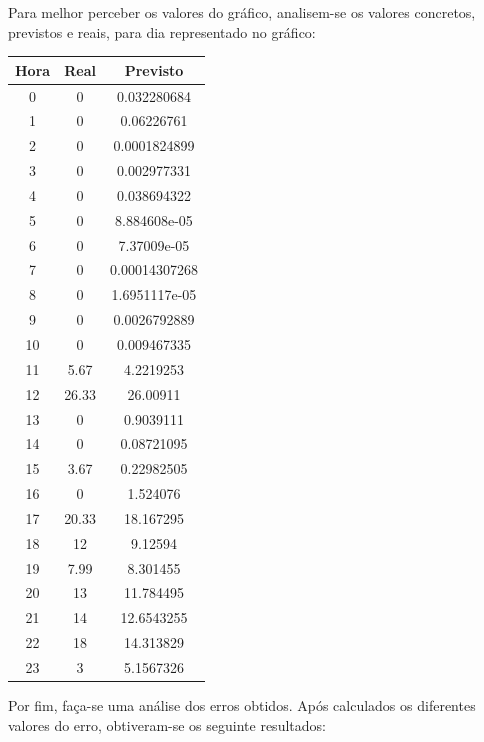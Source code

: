 \documentclass[a4paper, 12pt]{article}
\begin{document}
Para melhor perceber os valores do gráfico, analisem-se os valores concretos, previstos e reais, para dia representado no gráfico:

\begin{table}[H]
	\centering
	\begin{tabular}{||c||c|c||}
		\hline\hline
		Hora & Real&Previsto\\
		\hline\hline
		0 & 
0
 & 0.032280684 \\
		\hline
		1  &
0 & 0.06226761\\
		\hline
		2 & 0 & 0.0001824899	\\
		\hline
		3  & 
0
 & 0.002977331\\
		\hline
		4 & 0
 &0.038694322 \\
		\hline
		5  & 0
 &8.884608e-05 \\
		\hline
		6 & 0

 & 

7.37009e-05 \\
		\hline
		7 & 
0
 & 0.00014307268\\
		\hline
		8  &
0 & 1.6951117e-05\\
		\hline
		9 &  0& 0.0026792889	\\
		\hline
		10 & 

0 &0.009467335 \\
		\hline
		11  &
5.67 & 4.2219253\\
		\hline
		12 & 26.33 & 26.00911	\\
		\hline
		13  & 
0
 &0.9039111 \\
		\hline
		14 & 0
 &0.08721095 \\
		\hline
		15  & 
3.67 & 0.22982505\\
		\hline
		16 & 

0 & 
1.524076
 \\
		\hline
		17 & 
20.33
 & 18.167295 \\
		\hline
		18  &
12 & 9.12594 \\
		\hline
		19 & 7.99 & 8.301455	\\
		\hline
		20 & 
13
 &11.784495 \\
		\hline
		21  &
14 &12.6543255 \\
		\hline
		22 & 18 & 14.313829	\\
		\hline
		23  & 3

 & 5.1567326\\
		\hline\hline
	\end{tabular}
\end{table}

Por fim, faça-se uma análise dos erros obtidos. Após calculados os diferentes valores do erro, obtiveram-se os seguinte resultados:
\end{document}
